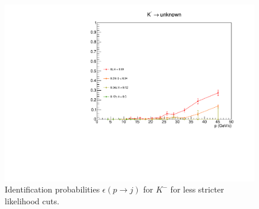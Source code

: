 \begin{figure}[!p]
  \includegraphics[scale=0.38]{./gfx/Km_u_less.pdf}
	\caption{Identification probabilities $\epsilon(p \rightarrow j)$ for $K^-$ for less stricter likelihood cuts.}
	\label{pic:Effkmless}
\end{figure}

